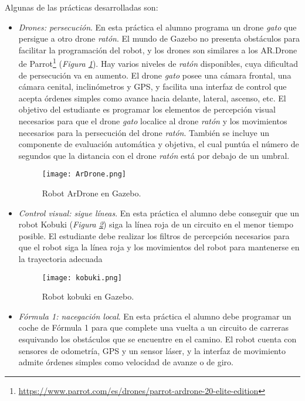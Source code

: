 Algunas de las prácticas desarrolladas son:
\begin{itemize}
	\item \textit{Drones: persecución}. En esta práctica el alumno programa un drone \textit{gato} que persigue a otro drone \textit{ratón}. El mundo de Gazebo no presenta obstáculos para facilitar la programación del robot, y los drones son similares a los AR.Drone de Parrot\footnote{\url{https://www.parrot.com/es/drones/parrot-ardrone-20-elite-edition}} (\textit{Figura \ref{fig:ardrone}}). Hay varios niveles de \textit{ratón} disponibles, cuya dificultad de persecución va en aumento. El drone \textit{gato} posee una cámara frontal, una cámara cenital, inclinómetros y GPS, y facilita una interfaz de control que acepta órdenes simples como avance hacia delante, lateral, ascenso, etc. El objetivo del estudiante es programar los elementos de percepción visual necesarios para que el drone \textit{gato} localice al drone \textit{ratón} y los movimientos necesarios para la persecución del drone \textit{ratón}. También se incluye un componente de evaluación automática y objetiva, el cual puntúa el número de segundos que la distancia con el drone \textit{ratón} está por debajo de un umbral.

\begin{figure}[h]
	\centering\texttt{[image: ArDrone.png]}
	\caption{Robot ArDrone en Gazebo.}
	\label{fig:ardrone}
\end{figure}
	
	\item \textit{Control visual: sigue líneas}. En esta práctica el alumno debe conseguir que un robot Kobuki (\textit{Figura \ref{fig:kobuki}}) siga la línea roja de un circuito en el menor tiempo posible. El estudiante debe realizar los filtros de percepción necesarios para que el robot siga la línea roja y los movimientos del robot para mantenerse en la trayectoria adecuada

\begin{figure}[h]
	\centering\texttt{[image: kobuki.png]}
	\caption{Robot kobuki en Gazebo.}
	\label{fig:kobuki}
\end{figure}
	
	\item \textit{Fórmula 1: nacegación local}. En esta práctica el alumno debe programar un coche de Fórmula 1 para que complete una vuelta a un circuito de carreras esquivando los obstáculos que se encuentre en el camino. El robot cuenta con sensores de odometría, GPS y un sensor láser, y la interfaz de movimiento admite órdenes simples como velocidad de avanze o de giro.
	

\end{itemize}
